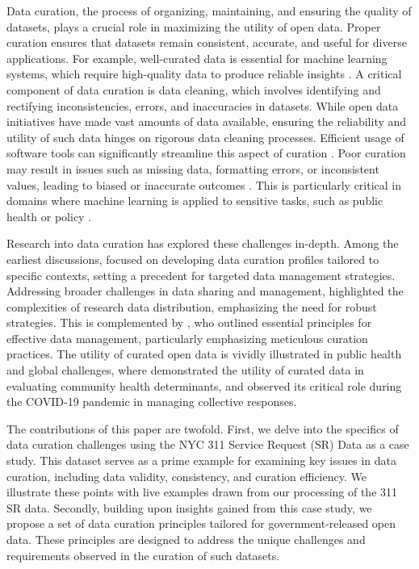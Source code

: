 \documentclass[linenumber]{jdsart}
\begin{document}
Data curation, the process of organizing, maintaining, and ensuring
the quality of datasets, plays a crucial role in maximizing the
utility of open data. Proper curation ensures that datasets remain
consistent, accurate, and useful for diverse applications. For example, 
well\mbox{-}curated data is essential for machine learning systems, which 
require high\mbox{-}quality data to produce reliable insights 
\citep{polyzotis2019data, jain2020overview}. A critical component of 
data curation is data cleaning, which involves identifying and rectifying 
inconsistencies, errors, and inaccuracies in datasets. While open data 
initiatives have made vast amounts of data available, ensuring the 
reliability and utility of such data hinges on rigorous data cleaning processes. 
Efficient usage of software tools can significantly streamline this 
aspect of curation \citep[e.g.,][]{cody2017cody, van2018statistical}. Poor 
curation may result in issues such as missing data, formatting errors, 
or inconsistent values, leading to biased or inaccurate outcomes 
\citep{geiger2020garbage}. This is particularly critical in domains 
where machine learning is applied to sensitive tasks, such as public 
health or policy \citep{rahm2000data}.


Research into data curation has explored these challenges in\mbox{-}depth. 
Among the earliest discussions, \citet{witt2009constructing} focused 
on developing data curation profiles tailored to specific contexts, 
setting a precedent for targeted data management strategies. 
Addressing broader challenges in data sharing and management, 
\citet{borgman2012conundrum} highlighted the complexities of 
research data distribution, emphasizing the need for robust 
strategies. This is complemented by \citet{hart2016ten}, who outlined 
essential principles for effective data management, particularly 
emphasizing meticulous curation practices. The utility of curated 
open data is vividly illustrated in public health and global challenges, 
where \citet{cantor2018facets} demonstrated the utility of curated 
data in evaluating community health determinants, and 
\citet{shankar2021data} observed its critical role during the 
COVID\mbox{-}19 pandemic in managing collective responses.


The contributions of this paper are twofold. First, we delve into
the specifics of data curation challenges using the NYC 311 Service
Request (SR) Data as a case study. This dataset serves as a prime 
example for examining key issues in data curation, including data 
validity, consistency, and curation efficiency. We illustrate these 
points with live examples drawn from our 
processing of the 311 SR data. Secondly, building upon insights 
gained from this case study, we propose a set of data curation 
principles tailored for government\mbox{-}released open data. These 
principles are designed to address the unique challenges 
and requirements observed in the curation of such datasets.
\end{document}
